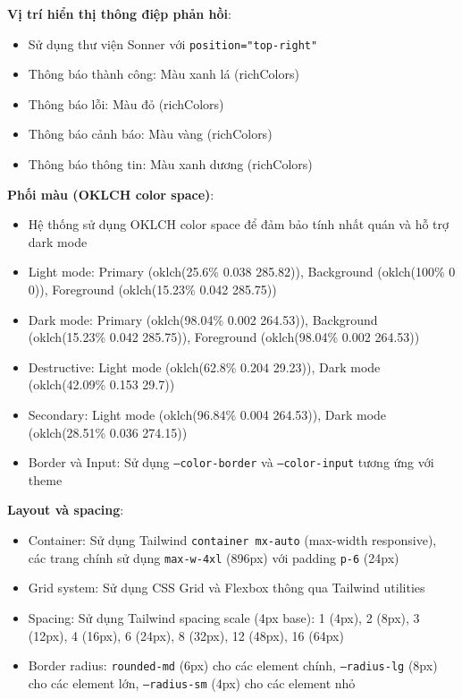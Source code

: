 \documentclass[../DoAn.tex]{subfiles}
\begin{document}
\textbf{Vị trí hiển thị thông điệp phản hồi}:
\begin{itemize}
    \item Sử dụng thư viện Sonner với \texttt{position="top-right"}
    \item Thông báo thành công: Màu xanh lá (richColors)
    \item Thông báo lỗi: Màu đỏ (richColors)
    \item Thông báo cảnh báo: Màu vàng (richColors)
    \item Thông báo thông tin: Màu xanh dương (richColors)
\end{itemize}

\textbf{Phối màu (OKLCH color space)}:
\begin{itemize}
    \item Hệ thống sử dụng OKLCH color space để đảm bảo tính nhất quán và hỗ trợ dark mode
    \item Light mode: Primary (oklch(25.6\% 0.038 285.82)), Background (oklch(100\% 0 0)), Foreground (oklch(15.23\% 0.042 285.75))
    \item Dark mode: Primary (oklch(98.04\% 0.002 264.53)), Background (oklch(15.23\% 0.042 285.75)), Foreground (oklch(98.04\% 0.002 264.53))
    \item Destructive: Light mode (oklch(62.8\% 0.204 29.23)), Dark mode (oklch(42.09\% 0.153 29.7))
    \item Secondary: Light mode (oklch(96.84\% 0.004 264.53)), Dark mode (oklch(28.51\% 0.036 274.15))
    \item Border và Input: Sử dụng \texttt{--color-border} và \texttt{--color-input} tương ứng với theme
\end{itemize}

\textbf{Layout và spacing}:
\begin{itemize}
    \item Container: Sử dụng Tailwind \texttt{container mx-auto} (max-width responsive), các trang chính sử dụng \texttt{max-w-4xl} (896px) với padding \texttt{p-6} (24px)
    \item Grid system: Sử dụng CSS Grid và Flexbox thông qua Tailwind utilities
    \item Spacing: Sử dụng Tailwind spacing scale (4px base): 1 (4px), 2 (8px), 3 (12px), 4 (16px), 6 (24px), 8 (32px), 12 (48px), 16 (64px)
    \item Border radius: \texttt{rounded-md} (6px) cho các element chính, \texttt{--radius-lg} (8px) cho các element lớn, \texttt{--radius-sm} (4px) cho các element nhỏ
\end{itemize}
\end{document}
